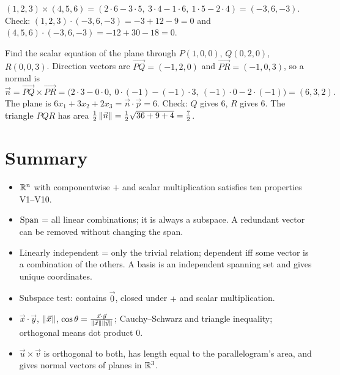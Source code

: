 \begin{example}
$(1,2,3)\times(4,5,6) = (2\cdot6-3\cdot5,\ 3\cdot4-1\cdot6,\ 1\cdot5-2\cdot4) = (-3,6,-3)$.
Check: $(1,2,3)\cdot(-3,6,-3)=-3+12-9=0$ and $(4,5,6)\cdot(-3,6,-3)=-12+30-18=0$.
\end{example}

\begin{example}
Find the scalar equation of the plane through $P(1,0,0)$, $Q(0,2,0)$, $R(0,0,3)$. Direction
vectors are $\vec{PQ}=(-1,2,0)$ and $\vec{PR}=(-1,0,3)$, so a normal is
\[
\vec n=\vec{PQ}\times\vec{PR}=\big(2\cdot3-0\cdot0,\ 0\cdot(-1)-(-1)\cdot3,\ (-1)\cdot0-2\cdot(-1)\big)=(6,3,2).
\]
The plane is $6x_1+3x_2+2x_3 = \vec n\cdot\vec p = 6$. Check: $Q$ gives $6$, $R$ gives $6$.
The triangle $PQR$ has area $\frac12\left\lVert \vec n \right\rVert=\frac12\sqrt{36+9+4}=\frac72$.
\end{example}

\section*{Summary}
\begin{itemize}
  \item $\mathbb{R}^n$ with componentwise $+$ and scalar multiplication satisfies ten properties V1--V10.
  \item $\operatorname{Span}$ = all linear combinations; it is always a subspace. A redundant vector can be
        removed without changing the span.
  \item Linearly independent = only the trivial relation; dependent iff some vector is a
        combination of the others. A basis is an independent spanning set and gives unique
        coordinates.
  \item Subspace test: contains $\vec 0$, closed under $+$ and scalar multiplication.
  \item $\vec x\cdot\vec y$, $\left\lVert \vec x \right\rVert$, $\cos\theta=\frac{\vec x\cdot\vec y}{\left\lVert \vec x \right\rVert\left\lVert \vec y \right\rVert}$;
        Cauchy--Schwarz and triangle inequality; orthogonal means dot product $0$.
  \item $\vec u\times\vec v$ is orthogonal to both, has length equal to the parallelogram's area,
        and gives normal vectors of planes in $\mathbb{R}^3$.
\end{itemize}
